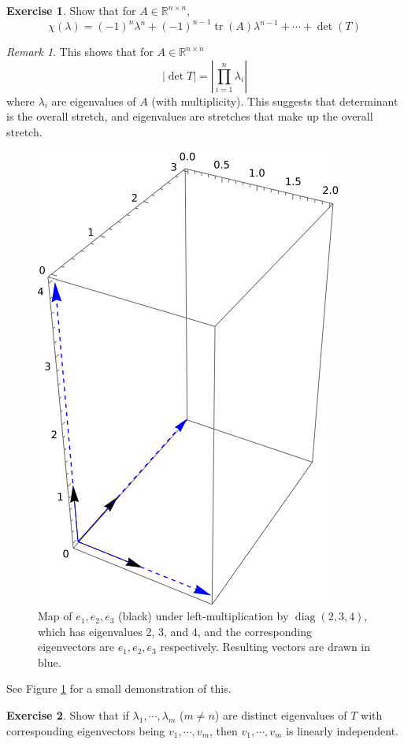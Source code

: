 \documentclass[12pt, a4paper]{article}
\newcommand{\R}{\mathbb{R}}
\DeclareMathOperator{\tr}{tr}
\DeclareMathOperator{\diag}{diag}
\theoremstyle{remark}
\newtheorem{remark}{Remark}
\theoremstyle{definition}
\newtheorem{exercise}{Exercise}
\numberwithin{equation}{section}
\numberwithin{definition}{section}
\numberwithin{example}{section}
\numberwithin{exercise}{section}
\numberwithin{remark}{section}
\numberwithin{figure}{section}
\begin{document}
\begin{exercise}
    Show that for $A \in \R^{n \times n}$,
    \begin{equation*}
        \chi (\lambda) = \left( -1 \right)^n \lambda^n + \left( -1 \right)^{n-1} \tr \left( A \right) \lambda^{n-1} + \cdots + \det \left( T \right)
    \end{equation*}
\end{exercise}
\begin{remark}
    This shows that for $A \in \R^{n \times n}$
    \begin{equation*}
        | \det {T} | = \left| \prod_{i=1}^n \lambda_i \right|
    \end{equation*}
    where $\lambda_i$ are eigenvalues of $A$ (with multiplicity).
    This suggests that determinant is the overall stretch,
    and eigenvalues are stretches that make up the overall stretch.
    \begin{figure}[tbp]
        \centering
        \includegraphics{EigenvalueDeterminant}
        \caption{Map of $e_1, e_2, e_3$ (black) under left-multiplication by $\diag \left( 2, 3, 4 \right)$, which has eigenvalues 2, 3, and 4, and the corresponding eigenvectors are $e_1, e_2, e_3$ respectively. Resulting vectors are drawn in blue.}
        \label{fig: EigenvalueDeterminant}
    \end{figure}
    See Figure \ref{fig: EigenvalueDeterminant} for a small demonstration of this.
\end{remark}
\begin{exercise}
    Show that if $\lambda_1, \cdots, \lambda_m$ ($m \neq n$) are distinct eigenvalues of $T$ with
    corresponding eigenvectors being $v_1, \cdots, v_m$, then
    $v_1, \cdots, v_m$ is linearly independent.
\end{exercise}
\end{document}
